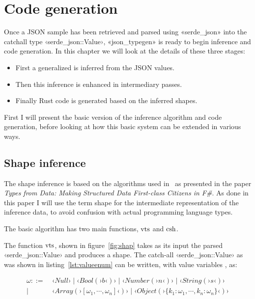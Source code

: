 
\chapter{Code generation}
\label{sec:code-generation}

Once a JSON sample has been retrieved and parsed using «serde_json» into the catchall type ‹serde_json::Value›, «json_typegen» is ready to begin inference and code generation. In this chapter we will look at the details of these three stages:

\begin{itemize}
  \item First a generalized  is inferred from the JSON values.
  \item Then this inference is enhanced in intermediary passes.
  \item Finally Rust code is generated based on the inferred shapes.
\end{itemize}

First I will present the basic version of the inference algorithm and code generation, before looking at how this basic system can be extended in various ways.

\section{Shape inference}

The shape inference is based on the algorithms used in \fsharpdata\ as presented in the paper \emph{Types from Data: Making Structured Data First-class Citizens in F\#}\cite{fsharp-types-from-data}. As done in this paper I will use the term shape for the intermediate representation of the inference data, to avoid confusion with actual programming language types.


The basic algorithm has two main functions, $\operatorname{vts}$ and $\operatorname{csh}$.

The function $\operatorname{vts}$, shown in figure~\ref{fig:shap} takes as its input the parsed ‹serde_json::Value› and produces a shape. The catch-all ‹serde_json::Value› as was shown in listing~\ref{lst:valueenum} can be written, with value variables \omega, as:

\begin{align*}
\omega ::=  &\ ‹Null› \mid ‹Bool(›b‹)› \mid ‹Number(›n‹)› \mid ‹String(›s‹)› \\ \mid &\ ‹Array(›[\omega_1, \cdots, \omega_n]‹)› \mid ‹Object(›\{ k_1 : \omega_1, \cdots, k_n : \omega_n \}‹)›
\end{align*}

